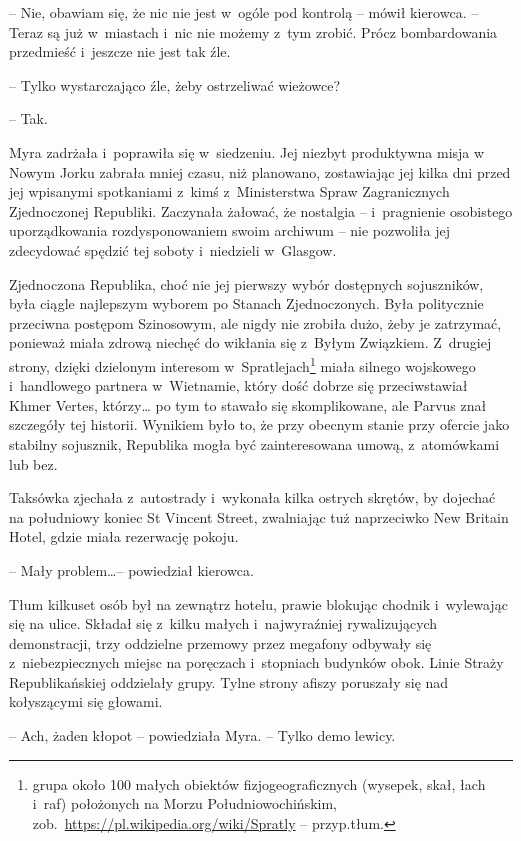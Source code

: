 \documentclass[oneside,polish,11pt,sfheadings]{mwbk}
\begin{document}
-- Nie, obawiam się, że nic nie jest w~ogóle pod kontrolą -- mówił
kierowca. -- Teraz są już w~miastach i~nic nie możemy z~tym zrobić. Prócz
bombardowania przedmieść i~jeszcze nie jest tak źle.

-- Tylko wystarczająco źle, żeby ostrzeliwać wieżowce?

-- Tak.

Myra zadrżała i~poprawiła się w~siedzeniu. Jej niezbyt produktywna misja
w Nowym Jorku zabrała mniej czasu, niż planowano, zostawiając jej kilka
dni przed jej wpisanymi spotkaniami z~kimś z~Ministerstwa Spraw
Zagranicznych Zjednoczonej Republiki. Zaczynała żałować, że nostalgia -- i~pragnienie osobistego uporządkowania rozdysponowaniem swoim archiwum -- nie pozwoliła jej zdecydować spędzić tej soboty i~niedzieli w~Glasgow.

Zjednoczona Republika, choć nie jej pierwszy wybór dostępnych
sojuszników, była ciągle najlepszym wyborem po Stanach Zjednoczonych.
Była politycznie przeciwna postępom Szinosowym, ale nigdy nie zrobiła
dużo, żeby je zatrzymać, ponieważ miała zdrową niechęć do wikłania się z~Byłym Związkiem. Z~drugiej strony, dzięki dzielonym interesom w~Spratlejach\footnote{ grupa około 100 małych obiektów fizjogeograficznych
(wysepek, skał, łach i~raf) położonych na Morzu Południowochińskim,
zob.~\url{https://pl.wikipedia.org/wiki/Spratly} -- przyp.tłum.} miała silnego wojskowego i~handlowego partnera w~Wietnamie, który dość dobrze się przeciwstawiał Khmer Vertes, którzy\ldots
po tym to stawało się skomplikowane, ale Parvus znał szczegóły tej
historii. Wynikiem było to, że przy obecnym stanie przy ofercie jako
stabilny sojusznik, Republika mogła być zainteresowana umową, z~atomówkami lub bez.

Taksówka zjechała z~autostrady i~wykonała kilka ostrych skrętów, by
dojechać na południowy koniec St Vincent Street, zwalniając tuż
naprzeciwko New Britain Hotel, gdzie miała rezerwację pokoju.

-- Mały problem\ldots -- powiedział kierowca.

Tłum kilkuset osób był na zewnątrz hotelu, prawie blokując chodnik i~wylewając się na ulice. Składał się z~kilku małych i~najwyraźniej
rywalizujących demonstracji, trzy oddzielne przemowy przez megafony
odbywały się z~niebezpiecznych miejsc na poręczach i~stopniach budynków
obok. Linie Straży Republikańskiej oddzielały grupy. Tylne strony afiszy
poruszały się nad kołyszącymi się głowami.

-- Ach, żaden kłopot -- powiedziała Myra. -- Tylko demo lewicy.
\end{document}
